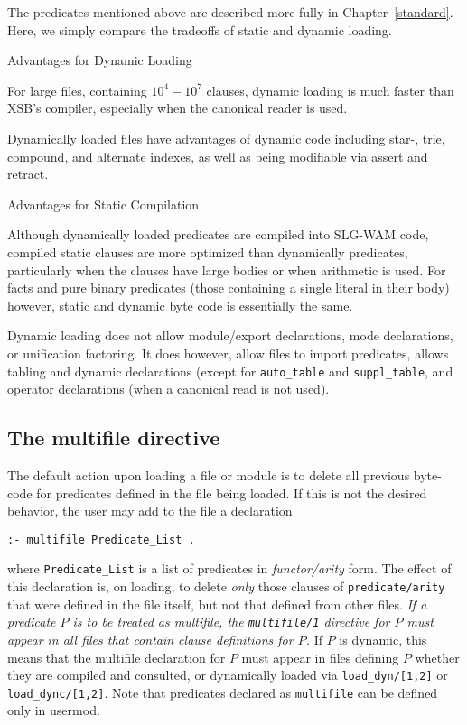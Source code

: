 The predicates mentioned above are described more fully in
Chapter~\ref{standard}.  Here, we simply compare the tradeoffs of
static and dynamic loading.
\bi
\item Advantages for Dynamic Loading
\bi
\item For large files, containing $10^4-10^7$ clauses, dynamic loading
  is much faster than XSB's compiler, especially when the canonical
  reader is used.
%
\item Dynamically loaded files have advantages of dynamic code
  including star-, trie, compound, and alternate indexes, as well as
  being modifiable via assert and retract.
\ei
\item Advantages for Static Compilation
\bi
\item Although dynamically loaded predicates are compiled into SLG-WAM
  code, compiled static clauses are more optimized than dynamically
  predicates, particularly when the clauses have large bodies or when
  arithmetic is used.  For facts and pure binary predicates (those
  containing a single literal in their body) however, static and
  dynamic byte code is essentially the same.
%
\item Dynamic loading does not allow module/export declarations, mode
  declarations, or unification factoring.  It does however, allow
  files to import predicates, allows tabling and dynamic declarations (except for
  {\tt auto\_table} and {\tt suppl\_table}, and operator declarations
  (when a canonical read is not used).
\ei 
\ei

\subsection{The multifile directive}
The default action upon loading a file or module is to delete all
previous byte-code for predicates defined in the file being loaded.  If this is not
the desired behavior, the user may add to the file a declaration
\begin{center}
{\tt :- multifile Predicate\_List .} \\
\end{center}
where {\tt Predicate\_List} is a list of predicates in {\em
  functor/arity\/} form.  The effect of this declaration is, on loading, to delete
{\em only\/} those clauses of {\tt predicate/arity} that were defined
in the file itself, but not that defined from other files.
{\em If a predicate $P$ is to be treated as
  multifile, the {\tt multifile/1} directive for $P$ must appear in
  all files that contain clause definitions for $P$.}  If $P$ is
dynamic, this means that the multifile declaration for $P$ must appear
in files defining $P$ whether they are compiled and consulted, or
dynamically loaded via {\tt load\_dyn/[1,2]} or {\tt
  load\_dync/[1,2]}.
Note that predicates declared as {\tt multifile} can be defined only
in usermod.  

